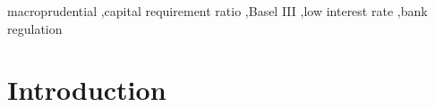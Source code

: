 \documentclass[final,3p,times,twocolumn]{elsarticle}
\begin{document}
\begin{frontmatter}
\begin{abstract}
\end{abstract}

\begin{keyword}
macroprudential \sep capital requirement ratio \sep Basel III \sep low interest rate \sep bank regulation


\end{keyword}

\end{frontmatter}


\section{Introduction}
\label{S:1}







\end{document}
